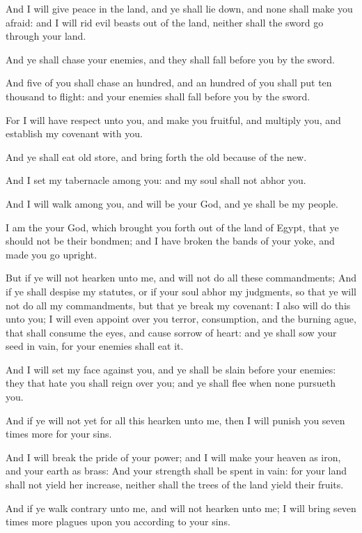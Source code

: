 \verse And I will give peace in the land, and ye shall lie down, and none shall make you afraid: and I will rid evil beasts out of the land, neither shall the sword go through your land.

\verse And ye shall chase your enemies, and they shall fall before you by the sword.

\verse And five of you shall chase an hundred, and an hundred of you shall put ten thousand to flight: and your enemies shall fall before you by the sword.

\verse For I will have respect unto you, and make you fruitful, and multiply you, and establish my covenant with you.

\verse And ye shall eat old store, and bring forth the old because of the new.

\verse And I set my tabernacle among you: and my soul shall not abhor you.

\verse And I will walk among you, and will be your God, and ye shall be my people.

\verse I am the \LORD your God, which brought you forth out of the land of Egypt, that ye should not be their bondmen; and I have broken the bands of your yoke, and made you go upright.

\verse But if ye will not hearken unto me, and will not do all these commandments; \verse And if ye shall despise my statutes, or if your soul abhor my judgments, so that ye will not do all my commandments, but that ye break my covenant: \verse I also will do this unto you; I will even appoint over you terror, consumption, and the burning ague, that shall consume the eyes, and cause sorrow of heart: and ye shall sow your seed in vain, for your enemies shall eat it.

\verse And I will set my face against you, and ye shall be slain before your enemies: they that hate you shall reign over you; and ye shall flee when none pursueth you.

\verse And if ye will not yet for all this hearken unto me, then I will punish you seven times more for your sins.

\verse And I will break the pride of your power; and I will make your heaven as iron, and your earth as brass: \verse And your strength shall be spent in vain: for your land shall not yield her increase, neither shall the trees of the land yield their fruits.

\verse And if ye walk contrary unto me, and will not hearken unto me; I will bring seven times more plagues upon you according to your sins.

